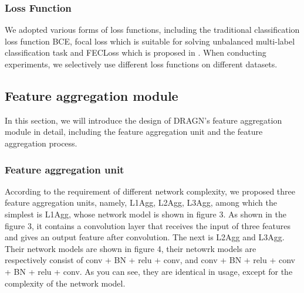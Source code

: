 \documentclass[10pt,twocolumn,letterpaper]{article}
\begin{document}
\subsubsection{Loss Function}
We adopted various forms of loss functions, including the traditional classification loss function BCE, focal loss which is suitable for solving unbalanced multi-label classification task and FECLoss which is proposed in \cite{ref27}. When conducting experiments, we selectively use different loss functions on different datasets.

\subsection{Feature aggregation module}
In this section, we will introduce the design of DRAGN's feature aggregation module in detail, including the feature aggregation unit and the feature aggregation process.

\subsubsection{Feature aggregation unit}
According to the requirement of different network complexity, we proposed three feature aggregation units, namely, L1Agg, L2Agg, L3Agg, among which the simplest is L1Agg, whose network model is shown in figure 3. As shown in the figure 3, it contains a convolution layer that receives the input of three features and gives an output feature after convolution. The next is L2Agg and L3Agg. Their network models are shown in figure 4, their netowrk models are respectively consist of conv + BN + relu + conv, and conv + BN + relu + conv + BN + relu + conv. As you can see, they are identical in usage, except for the complexity of the network model.
\end{document}
